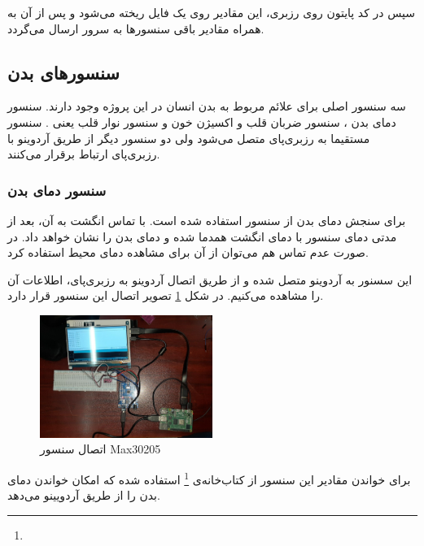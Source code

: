 سپس در کد پایتون روی رزبری، این مقادیر روی یک فایل ریخته می‌شود و پس از آن به همراه مقادیر باقی سنسورها به سرور ارسال می‌گردد.




\subsection{سنسورهای بدن}

سه سنسور اصلی برای علائم مربوط به بدن انسان در این پروژه وجود دارند. سنسور دمای بدن ، سنسور  ضربان قلب و اکسیژن خون  و سنسور نوار قلب یعنی . سنسور  مستقیما به رزبری‌پای متصل می‌شود ولی دو سنسور دیگر از طریق آردوینو با رزبری‌پای ارتباط برقرار می‌کنند.


\subsubsection{سنسور دمای بدن}



برای سنجش دمای بدن از سنسور  استفاده شده است. با تماس انگشت به آن، بعد از مدتی دمای سنسور با دمای انگشت همدما شده و دمای بدن را نشان خواهد داد. در صورت عدم تماس هم می‌توان از آن برای مشاهده دمای محیط استفاده کرد.

این سسنور به آردوینو متصل شده و از طریق اتصال آردوینو به رزبری‌پای، اطلاعات آن را مشاهده می‌کنیم. در شکل \ref{fig:4} تصویر اتصال این سنسور قرار دارد.

\begin{figure}[h]
	\centering
	\includegraphics[width=0.5\textwidth]{figs/max30205.jpg}
	
	\caption{اتصال سنسور Max30205}
	\label{fig:4}
\end{figure}


برای خواندن مقادیر این سنسور از کتاب‌خانه‌ی
\footnote{}
 استفاده شده که امکان خواندن دمای بدن را از طریق آردویینو می‌دهد.

